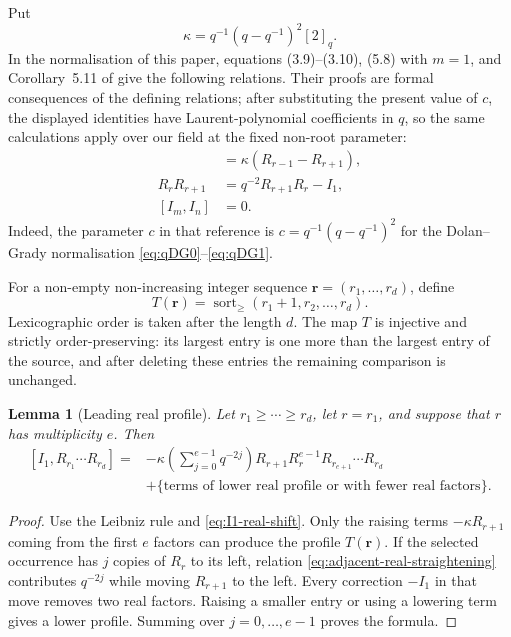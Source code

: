 \documentclass[11pt]{extarticle}
\newtheorem{lemma}[theorem]{Lemma}
\theoremstyle{definition}
\theoremstyle{remark}
\numberwithin{equation}{section}
\begin{document}
Put
\[
        \kappa=q^{-1}(q-q^{-1})^2[2]_q.
\]
In the normalisation of this paper, equations (3.9)--(3.10), (5.8) with $m=1$,
and Corollary~5.11 of \cite{BaseilhacKolb2020} give the following
relations.  Their proofs are formal consequences of the defining relations;
after substituting the present value of $c$, the displayed identities have
Laurent-polynomial coefficients in $q$, so the same calculations apply over
our field at the fixed non-root parameter:
\begin{align}
[I_1,R_r]&=\kappa(R_{r-1}-R_{r+1}),
\label{eq:I1-real-shift}\\
R_rR_{r+1}&=q^{-2}R_{r+1}R_r-I_1,
\label{eq:adjacent-real-straightening}\\
[I_m,I_n]&=0.
\label{eq:imaginary-commute}
\end{align}
Indeed, the parameter $c$ in that reference is
$c=q^{-1}(q-q^{-1})^2$ for the Dolan--Grady normalisation
\eqref{eq:qDG0}--\eqref{eq:qDG1}.

For a non-empty non-increasing integer sequence
$\boldsymbol r=(r_1,\ldots,r_d)$, define
\[
        T(\boldsymbol r)
        =\operatorname{sort}_{\geq}(r_1+1,r_2,\ldots,r_d).
\]
Lexicographic order is taken after the length $d$.  The map $T$ is injective
and strictly order-preserving: its largest entry is one more than the
largest entry of the source, and after deleting these entries the remaining
comparison is unchanged.

\begin{lemma}[Leading real profile]
\label{lem:leading-real-profile}
Let $r_1\geq\cdots\geq r_d$, let $r=r_1$, and suppose that $r$ has
multiplicity $e$.  Then
\begin{equation}
\label{eq:leading-real-commutator}
 \begin{split}
 [I_1,R_{r_1}\cdots R_{r_d}]
 ={}&-\kappa\left(\sum_{j=0}^{e-1}q^{-2j}\right)
 R_{r+1}R_r^{e-1}R_{r_{e+1}}\cdots R_{r_d}\\
 &+\{\text{terms of lower real profile or with fewer real factors}\}.
 \end{split}
\end{equation}
\end{lemma}

\begin{proof}
Use the Leibniz rule and \eqref{eq:I1-real-shift}.  Only the raising terms
$-\kappa R_{r+1}$ coming from the first $e$ factors can produce the profile
$T(\boldsymbol r)$.  If the selected occurrence has $j$ copies of $R_r$ to
its left, relation \eqref{eq:adjacent-real-straightening} contributes
$q^{-2j}$ while moving $R_{r+1}$ to the left.  Every correction $-I_1$ in
that move removes two real factors.  Raising a smaller entry or using a
lowering term gives a lower profile.  Summing over $j=0,\ldots,e-1$ proves
the formula.
\end{proof}
\end{document}
